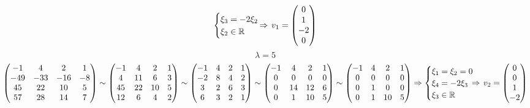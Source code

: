 \documentclass{article}
\newcommand{\la}{\lambda}
\newcommand{\shiftleft}[3]{\makebox[#1][r]{\makebox[#2][l]{#3}}}
\begin{document}
\begin{center}
$$\begin{cases}
\xi_3 = -2\xi_2 \\
\xi_2 \in \mathbb{R}
\end{cases} \shiftleft{3pt}{14pt}{$\Rightarrow$} v_1 = \begin{pmatrix}
0 \\ 1 \\ -2 \\ 0
\end{pmatrix}$$
$$\la = 5$$
$$\begin{pmatrix}
-1 & 4 & 2 & 1 \\
-49 & -33 & -16 & -8 \\
45 & 22 & 10 & 5 \\
57 & 28 & 14 & 7 \\
\end{pmatrix} \sim \begin{pmatrix}
-1 & 4 & 2 & 1 \\
4 & 11 & 6 & 3 \\
45 & 22 & 10 & 5 \\
12 & 6 & 4 & 2 \\
\end{pmatrix} \sim \begin{pmatrix}
-1 & 4 & 2 & 1 \\
-2 & 8 & 4 & 2 \\
3 & 2 & 6 & 3 \\
6 & 3 & 2 & 1 \\
\end{pmatrix} \sim \begin{pmatrix}
-1 & 4 & 2 & 1 \\
0 & 0 & 0 & 0 \\
0 & 14 & 12 & 6 \\
0 & 1 & 10 & 5 \\
\end{pmatrix} \sim \begin{pmatrix}
-1 & 4 & 2 & 1 \\
0 & 0 & 0 & 0 \\
0 & 1 & 0 & 0 \\
0 & 1 & 10 & 5 \\
\end{pmatrix} \Rightarrow \begin{cases}
\xi_1 = \xi_2 = 0 \\
\xi_4 = -2\xi_3 \\
\xi_3 \in \mathbb{R}
\end{cases}  \shiftleft{0pt}{14pt}{$\Rightarrow$} v_2=\begin{pmatrix}
0 \\ 0 \\ 1 \\ -2

\end{pmatrix}$$
\end{center}
\end{document}
